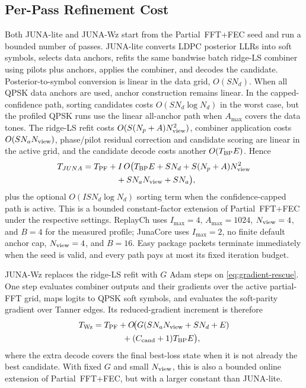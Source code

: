 \documentclass[journal]{IEEEtran}
\newcommand{\juna}{JUNA}
\newcommand{\junalite}{JUNA-lite}
\newcommand{\junawz}{JUNA-Wz}
\begin{document}
\subsection{Per-Pass Refinement Cost}
Both \junalite{} and \junawz{} start from the Partial~FFT+FEC seed and run a bounded
number of passes. \junalite{} converts LDPC posterior LLRs into soft symbols,
selects data anchors, refits the same bandwise batch ridge-LS combiner using pilots plus
anchors, applies the combiner, and decodes the candidate. Posterior-to-symbol
conversion is linear in the data
grid, $O(SN_d)$. When all QPSK data anchors are used, anchor construction remains
linear. In the capped-confidence path, sorting candidates costs
$O(SN_d\log N_d)$ in the worst case, but the profiled QPSK runs use the linear
all-anchor path when $A_{\max}$ covers the data tones. The ridge-LS refit costs
$O(S(N_p+A)N_{\rm view}^2)$, combiner application costs $O(SN_aN_{\rm view})$, phase/pilot residual
correction and candidate scoring are linear in the active grid, and the candidate
decode costs another $O(T_{\rm BP}E)$. Hence
\begin{equation}
\begin{aligned}
  T_{\juna}
  ={}& T_{\rm PF}
  + I\,O\big(T_{\rm BP}E+SN_d+S(N_p+A)N_{\rm view}^2\\
  &\hspace{2.7em}+SN_aN_{\rm view}+SN_a\big),
\end{aligned}
  \label{eq:juna-complexity}
\end{equation}
plus the optional $O(ISN_d\log N_d)$ sorting term when the confidence-capped path
is active. This is a bounded constant-factor extension of Partial~FFT+FEC under
the respective settings. ReplayCh uses $I_{\max}=4$, $A_{\max}=1024$,
$N_{\rm view}=4$, and $B=4$ for the measured profile; JunaCore uses
$I_{\max}=2$, no finite default anchor cap, $N_{\rm view}=4$, and $B=16$.
Easy package packets terminate immediately when the seed is valid, and every
path pays at most its fixed iteration budget.

\junawz{} replaces the ridge-LS refit with $G$ Adam steps on
\eqref{eq:gradient-rescue}. One step evaluates combiner outputs and their
gradients over the active partial-FFT grid, maps logits to QPSK soft symbols, and
evaluates the soft-parity gradient over Tanner edges. Its reduced-gradient
increment is therefore
\begin{equation}
\begin{aligned}
  T_{\rm Wz}
  ={}&T_{\rm PF}
   +O\!\big(G(SN_aN_{\rm view}+SN_d+E)\\
   &\hspace{2.2em}+(C_{\rm cand}+1)T_{\rm BP}E\big),
\end{aligned}
  \label{eq:wz-complexity}
\end{equation}
where the extra decode covers the final best-loss state when it is not already
the best candidate. With fixed $G$ and
small $N_{\rm view}$, this is also a bounded online extension of Partial~FFT+FEC,
but with a larger constant than \junalite{}.
\end{document}
